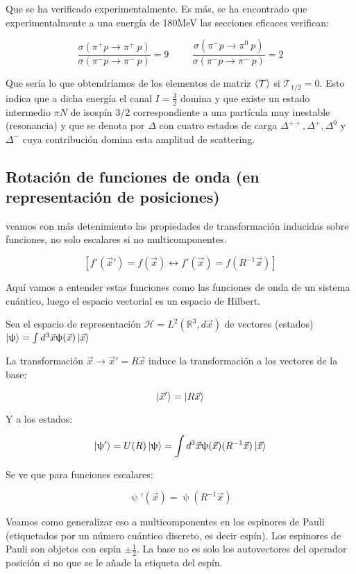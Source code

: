 \documentclass{article}
\begin{document}
Que se ha verificado experimentalmente. Es más, se ha encontrado que experimentalmente a una energía de 180MeV las secciones eficaces verifican:

$$\frac{\sigma (\pi ^+ p \to \pi ^+ \ p)}{\sigma (\pi ^-p \to \pi ^- \ p)}=9 \hspace{1cm} \frac{\sigma (\pi ^-p \to \pi ^0 \ p)}{\sigma (\pi ^-p \to \pi ^- \ p)}=2$$

Que sería lo que obtendríamos de los elementos de matriz $\braket{\mathcal{T}}$ si $\mathcal{T}_{1/2}=0$. Esto indica que a dicha energía el canal $I=\frac{3}{2}$ domina y que existe un estado intermedio $\pi N$ de isospín 3/2 correspondiente a una partícula muy inestable (resonancia) y que se denota por $\Delta$ con cuatro estados de carga $\Delta ^{++}, \Delta ^{+}, \Delta ^{0}$ y $\Delta ^{-}$ cuya contribución domina esta amplitud de scattering.

\subsection{Rotación de funciones de onda (en representación de posiciones)}

veamos con más detenimiento las propiedades de transformación inducidas sobre funciones, no solo escalares si no multicomponentes.

$$[f'(\Vec{x}')=f(\Vec{x}) \leftrightarrow f'(\Vec{x})=f(R^{-1}\Vec{x})]$$

Aquí vamos a entender estas funciones como las funciones de onda de un sistema cuántico, luego el espacio vectorial es un espacio de Hilbert.

\smallskip
Sea el espacio de representación $\mathcal{H}=L^2(\mathds{R}^3,d\Vec{x})$ de vectores (estados) $\ket{\uppsi}=\int d^3\Vec{x} \uppsi (\Vec{x})\ket{\Vec{x}}$

La transformación $\Vec{x} \to \Vec{x}'=R\Vec{x}$ induce la transformación a los vectores de la base:

$$\ket{\Vec{x}'}=\ket{R\Vec{x}}$$

Y a los estados:

$$\ket{\uppsi '}=U(R)\ket{\uppsi}=\int d^3\Vec{x} \uppsi (\Vec{x})(R^{-1}\Vec{x})\ket{\Vec{x}}$$

Se ve que para funciones escalares:

$$\uppsi '(\Vec{x})=\uppsi (R^{-1}\Vec{x})$$


Veamos como generalizar eso a multicomponentes en los espinores de Pauli (etiquetados por un número cuántico discreto, es decir espín). Los espinores de Pauli son objetos con espín $\pm \frac{1}{2}$. La base no es solo los autovectores del operador posición si no que se le añade la etiqueta del espín.
\end{document}
